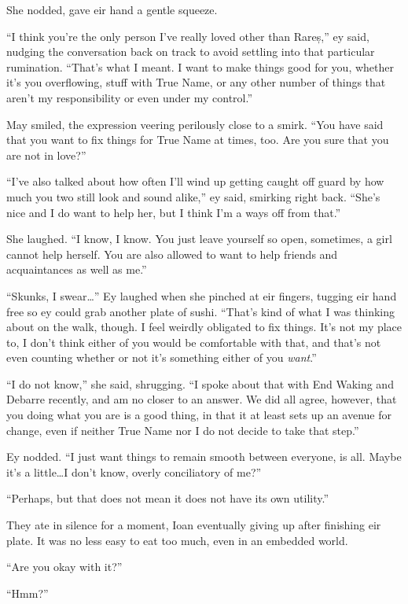 She nodded, gave eir hand a gentle squeeze.

``I think you're the only person I've really loved other than Rareș,'' ey said, nudging the conversation back on track to avoid settling into that particular rumination. ``That's what I meant. I want to make things good for you, whether it's you overflowing, stuff with True Name, or any other number of things that aren't my responsibility or even under my control.''

May smiled, the expression veering perilously close to a smirk. ``You have said that you want to fix things for True Name at times, too. Are you sure that you are not in love?''

``I've also talked about how often I'll wind up getting caught off guard by how much you two still look and sound alike,'' ey said, smirking right back. ``She's nice and I do want to help her, but I think I'm a ways off from that.''

She laughed. ``I know, I know. You just leave yourself so open, sometimes, a girl cannot help herself. You are also allowed to want to help friends and acquaintances as well as me.''

``Skunks, I swear\ldots{}'' Ey laughed when she pinched at eir fingers, tugging eir hand free so ey could grab another plate of sushi. ``That's kind of what I was thinking about on the walk, though. I feel weirdly obligated to fix things. It's not my place to, I don't think either of you would be comfortable with that, and that's not even counting whether or not it's something either of you \emph{want}.''

``I do not know,'' she said, shrugging. ``I spoke about that with End Waking and Debarre recently, and am no closer to an answer. We did all agree, however, that you doing what you are is a good thing, in that it at least sets up an avenue for change, even if neither True Name nor I do not decide to take that step.''

Ey nodded. ``I just want things to remain smooth between everyone, is all. Maybe it's a little\ldots I don't know, overly conciliatory of me?''

``Perhaps, but that does not mean it does not have its own utility.''

They ate in silence for a moment, Ioan eventually giving up after finishing eir plate. It was no less easy to eat too much, even in an embedded world.

``Are you okay with it?''

``Hmm?''

